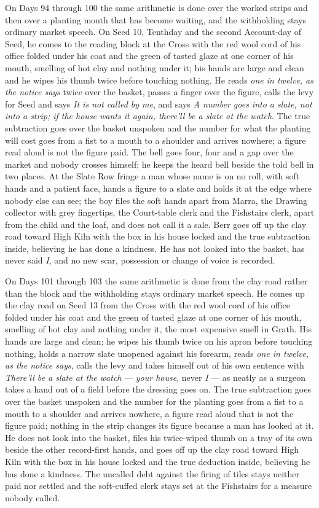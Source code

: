 \documentclass{design/chronicle}
\begin{document}
{On Days 94 through 100 the same arithmetic is done over the worked strips and then over a planting month that has become waiting, and the withholding stays ordinary market speech. On Seed 10, Tenthday and the second Account-day of Seed, he comes to the reading block at the Cross with the red wool cord of his office folded under his coat and the green of tasted glaze at one corner of his mouth, smelling of hot clay and nothing under it; his hands are large and clean and he wipes his thumb twice before touching nothing. He reads \emph{one in twelve, as the notice says} twice over the basket, passes a finger over the figure, calls the levy for Seed and says \emph{It is not called by me}, and says \emph{A number goes into a slate, not into a strip; if the house wants it again, there’ll be a slate at the watch}. The true subtraction goes over the basket unspoken and the number for what the planting will cost goes from a fist to a mouth to a shoulder and arrives nowhere; a figure read aloud is not the figure paid. The bell goes four, four and a gap over the market and nobody crosses himself; he keeps the heard bell beside the told bell in two places. At the Slate Row fringe a man whose name is on no roll, with soft hands and a patient face, hands a figure to a slate and holds it at the edge where nobody else can see; the boy files the soft hands apart from Marra, the Drawing collector with grey fingertips, the Court-table clerk and the Fishstairs clerk, apart from the child and the loaf, and does not call it a sale. Berr goes off up the clay road toward High Kiln with the box in his house locked and the true subtraction inside, believing he has done a kindness. He has not looked into the basket, has never said \emph{I}, and no new scar, possession or change of voice is recorded.

On Days 101 through 103 the same arithmetic is done from the clay road rather than the block and the withholding stays ordinary market speech. He comes up the clay road on Seed 13 from the Cross with the red wool cord of his office folded under his coat and the green of tasted glaze at one corner of his mouth, smelling of hot clay and nothing under it, the most expensive smell in Grath. His hands are large and clean; he wipes his thumb twice on his apron before touching nothing, holds a narrow slate unopened against his forearm, reads \emph{one in twelve, as the notice says}, calls the levy and takes himself out of his own sentence with \emph{There’ll be a slate at the watch} — \emph{your house}, never \emph{I} — as neatly as a surgeon takes a hand out of a field before the dressing goes on. The true subtraction goes over the basket unspoken and the number for the planting goes from a fist to a mouth to a shoulder and arrives nowhere, a figure read aloud that is not the figure paid; nothing in the strip changes its figure because a man has looked at it. He does not look into the basket, files his twice-wiped thumb on a tray of its own beside the other record-first hands, and goes off up the clay road toward High Kiln with the box in his house locked and the true deduction inside, believing he has done a kindness. The uncalled debt against the firing of tiles stays neither paid nor settled and the soft-cuffed clerk stays set at the Fishstairs for a measure nobody called.

}
\end{document}

